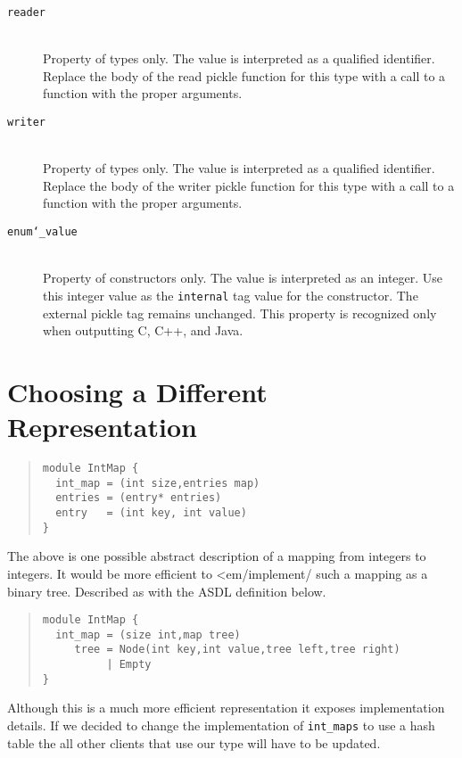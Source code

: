 \begin{description}
  \item[\texttt{reader}]\mbox{}\\
   Property of types only. The value is interpreted as a qualified
   identifier.  Replace the body of the read pickle function for this
   type with a call to a function with the proper arguments. 

  \item[\texttt{writer}]\mbox{}\\
   Property of types only. The value is interpreted as a qualified
   identifier.  Replace the body of the writer pickle function for this
   type with a call to a function with the proper arguments. 

  \item[\texttt{enum\char`\_value}]\mbox{}\\
   Property of constructors only. The value is interpreted as an integer.
   Use this integer value as the \lstinline!internal! tag value for the
   constructor. The external pickle tag remains unchanged. 
   This property is recognized only when outputting C, C++, and Java. 

\end{description}%

\section{Choosing a Different Representation}

\begin{quote}\begin{lstlisting}[language=ASDL]
module IntMap {
  int_map = (int size,entries map)
  entries = (entry* entries)
  entry   = (int key, int value)
}
\end{lstlisting}\end{quote}%
The above is one possible abstract description of a mapping from integers to
integers.  It would be more efficient to <em/implement/ such a mapping as
a binary tree. Described as with the ASDL definition below.
\begin{quote}\begin{lstlisting}[language=ASDL]
module IntMap {
  int_map = (size int,map tree)
     tree = Node(int key,int value,tree left,tree right)
          | Empty
}
\end{lstlisting}\end{quote}%

Although this is a much more efficient representation it exposes
implementation details. If we decided to change the implementation of
\lstinline!int_maps! to use a hash table the all other clients that use our type
will have to be updated.

